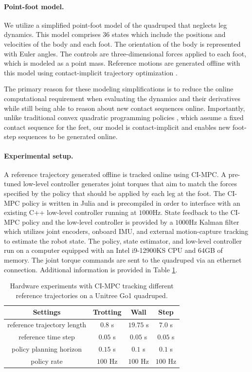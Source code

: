 \paragraph{Point-foot model.}
We utilize a simplified point-foot model of the quadruped that neglects leg dynamics. This model comprises 36 states which include the positions and velocities of the body and each foot. The orientation of the body is represented with Euler angles. The controls are three-dimensional forces applied to each foot, which is modeled as a point mass. Reference motions are generated offline with this model using contact-implicit trajectory optimization \cite{manchester2020variational}.

The primary reason for these modeling simplifications is to reduce the online computational requirement when evaluating the dynamics and their derivatives while still being able to reason about new contact sequences online. Importantly, unlike traditional convex quadratic programming policies \cite{bledt2017policy}, which assume a fixed contact sequence for the feet, our model is contact-implicit and enables new foot-step sequences to be generated online. 

\paragraph{Experimental setup.} 
A reference trajectory generated offline is tracked online using CI-MPC. A pre-tuned low-level controller generates joint torques that aim to match the forces specified by the policy that should be applied by each leg at the foot.
The CI-MPC policy is written in Julia and is precompiled in order to interface with an existing C++ low-level controller running at $1000$Hz. State feedback to the CI-MPC policy and the low-level controller is provided by a $1000$Hz Kalman filter which utilizes joint encoders, onboard IMU, and external motion-capture tracking to estimate the robot state. The policy, state estimator, and low-level controller run on a computer equipped with an Intel i9-12900KS CPU and 64GB of memory. The joint torque commands are sent to the quadruped via an ethernet connection. Additional information is provided in Table \ref{cipc_hardware_timing_table}.

\begin{table}[H]
	\centering
	\caption[Unitree Go1 quadruped hardware experiment details]{Hardware experiments with CI-MPC tracking different reference trajectories on a Unitree Go1 quadruped.}
	\begin{tabular}{c c c c}
		\toprule
		\textbf{Settings}  & \textbf{Trotting} & \textbf{Wall} & \textbf{Step}\\
		\toprule
		reference trajectory length & $0.8$ s & $19.75$ s & $7.0$ s \\
		reference time step & $0.05$ s & $0.05$ s & $0.05$ s\\
		policy planning horizon & $0.15$ s & $0.1$ s  & $0.1$ s\\
		policy rate & $100$ Hz & $100$ Hz & $100$ Hz\\
		\toprule
	\end{tabular}
	\label{cipc_hardware_timing_table}
\end{table}

